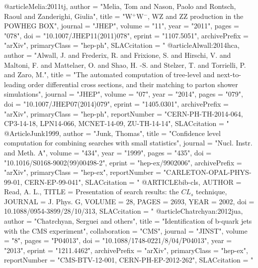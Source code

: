 @article{Melia:2011tj,
      author         = "Melia, Tom and Nason, Paolo and Rontsch, Raoul and
                        Zanderighi, Giulia",
      title          = "{W$^+$W$^-$, WZ and ZZ production in the POWHEG BOX}",
      journal        = "JHEP",
      volume         = "11",
      year           = "2011",
      pages          = "078",
      doi            = "10.1007/JHEP11(2011)078",
      eprint         = "1107.5051",
      archivePrefix  = "arXiv",
      primaryClass   = "hep-ph",
      SLACcitation   = "%
}
@article{Alwall:2014hca,
      author         = "Alwall, J. and Frederix, R. and Frixione, S. and Hirschi,
                        V. and Maltoni, F. and Mattelaer, O. and Shao, H. -S. and
                        Stelzer, T. and Torrielli, P. and Zaro, M.",
      title          = "{The automated computation of tree-level and
                        next-to-leading order differential cross sections, and
                        their matching to parton shower simulations}",
      journal        = "JHEP",
      volume         = "07",
      year           = "2014",
      pages          = "079",
      doi            = "10.1007/JHEP07(2014)079",
      eprint         = "1405.0301",
      archivePrefix  = "arXiv",
      primaryClass   = "hep-ph",
      reportNumber   = "CERN-PH-TH-2014-064, CP3-14-18, LPN14-066, MCNET-14-09,
                        ZU-TH-14-14",
      SLACcitation   = "%
}
@Article{Junk1999,
  author    = "Junk, Thomas",
  title     = "{Confidence level computation for combining searches with small statistics}",
  journal   = "Nucl. Instr. and Meth. A",
  volume    = "434",
  year      = "1999",
  pages     = "435",
  doi       = "10.1016/S0168-9002(99)00498-2",
      eprint         = "hep-ex/9902006",
      archivePrefix  = "arXiv",
      primaryClass   = "hep-ex",
      reportNumber   = "CARLETON-OPAL-PHYS-99-01, CERN-EP-99-041",
  SLACcitation  = "%
}
@ARTICLE{bib-cls,
  AUTHOR         = {Read, A. L.},
  TITLE          = {Presentation of search results: the ${CL}_s$ technique},
  JOURNAL        = {J. Phys. G},
  VOLUME         = {28},
  PAGES          = {2693},
  YEAR           = {2002},
  doi            = {10.1088/0954-3899/28/10/313},
      SLACcitation   = "%
}
@article{Chatrchyan:2012jua,
      author         = "Chatrchyan, Serguei and others",
      title          = "{Identification of b-quark jets with the {CMS} experiment}",
      collaboration  = "CMS",
      journal        = "JINST",
      volume         = "8",
      pages          = "P04013",
      doi            = "10.1088/1748-0221/8/04/P04013",
      year           = "2013",
      eprint         = "1211.4462",
      archivePrefix  = "arXiv",
      primaryClass   = "hep-ex",
      reportNumber   = "CMS-BTV-12-001, CERN-PH-EP-2012-262",
      SLACcitation   = "%
}
